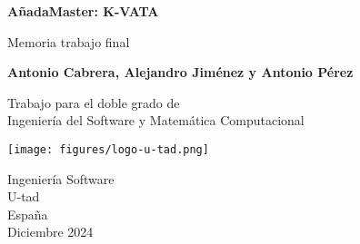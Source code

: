 \documentclass{report}
\begin{document}
\begin{titlepage}
    \begin{center}
        \vspace*{1cm}
 
        \Large\textbf{AñadaMaster: K-VATA}
 
        \vspace{0.5cm}
            Memoria trabajo final
        \vspace{1.5cm}
 
        \textbf{Antonio Cabrera, Alejandro Jiménez y Antonio Pérez}
 
        \vfill
             
        Trabajo para el doble grado de\\
        Ingeniería del Software y Matemática Computacional\\
             
        \vspace{0.8cm}
      
        \texttt{[image: figures/logo-u-tad.png]}
             
        Ingeniería Software\\
        U-tad\\
        España\\
        Diciembre 2024
             
    \end{center}
 \end{titlepage}

\tableofcontents

\listoffigures












\end{document}
